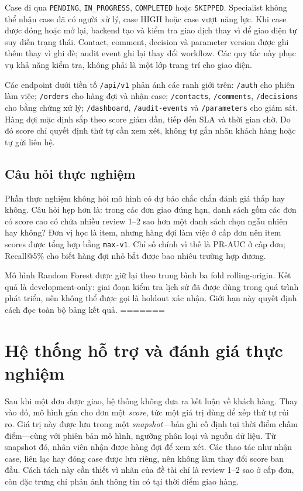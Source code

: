 Case đi qua \texttt{PENDING}, \texttt{IN\_PROGRESS}, \texttt{COMPLETED} hoặc \texttt{SKIPPED}. Specialist không thể nhận case đã có người xử lý, case HIGH hoặc case vượt năng lực. Khi case được đóng hoặc mở lại, backend tạo và kiểm tra giao dịch thay vì để giao diện tự suy diễn trạng thái. Contact, comment, decision và parameter version được ghi thêm thay vì ghi đè; audit event ghi lại thay đổi workflow. Các quy tắc này phục vụ khả năng kiểm tra, không phải là một lớp trang trí cho giao diện.

Các endpoint dưới tiền tố \texttt{/api/v1} phản ánh các ranh giới trên: \texttt{/auth} cho phiên làm việc; \texttt{/orders} cho hàng đợi và nhận case; \texttt{/contacts}, \texttt{/comments}, \texttt{/decisions} cho bằng chứng xử lý; \texttt{/dashboard}, \texttt{/audit-events} và \texttt{/parameters} cho giám sát. Hàng đợi mặc định sắp theo score giảm dần, tiếp đến SLA và thời gian chờ. Do đó score chỉ quyết định thứ tự cần xem xét, không tự gắn nhãn khách hàng hoặc tự gửi liên hệ.

\section{Câu hỏi thực nghiệm}

Phần thực nghiệm không hỏi mô hình có dự báo chắc chắn đánh giá thấp hay không. Câu hỏi hẹp hơn là: trong các đơn giao đúng hạn, danh sách gồm các đơn có score cao có chứa nhiều review 1--2 sao hơn một danh sách chọn ngẫu nhiên hay không? Đơn vị học là item, nhưng hàng đợi làm việc ở cấp đơn nên item scores được tổng hợp bằng \texttt{max-v1}. Chỉ số chính vì thế là PR-AUC ở cấp đơn; Recall@5\% cho biết hàng đợi nhỏ bắt được bao nhiêu trường hợp dương.

Mô hình Random Forest được giữ lại theo trung bình ba fold rolling-origin. Kết quả là development-only: giai đoạn kiểm tra lịch sử đã được dùng trong quá trình phát triển, nên không thể được gọi là holdout xác nhận. Giới hạn này quyết định cách đọc toàn bộ bảng kết quả.
=======
\chapter{Hệ thống hỗ trợ và đánh giá thực nghiệm}\label{ch:system-experiment}

Sau khi một đơn được giao, hệ thống không đưa ra kết luận về khách hàng. Thay vào đó, mô hình gán cho đơn một \textit{score}, tức một giá trị dùng để xếp thứ tự rủi ro. Giá trị này được lưu trong một \textit{snapshot}---bản ghi cố định tại thời điểm chấm điểm---cùng với phiên bản mô hình, ngưỡng phân loại và nguồn dữ liệu. Từ snapshot đó, nhân viên nhận được hàng đợi để xem xét. Các thao tác như nhận case, liên lạc hay đóng case được lưu riêng, nên không làm thay đổi score ban đầu. Cách tách này cần thiết vì nhãn của đề tài chỉ là review 1--2 sao ở cấp đơn, còn đặc trưng chỉ phản ánh thông tin có tại thời điểm giao hàng.

